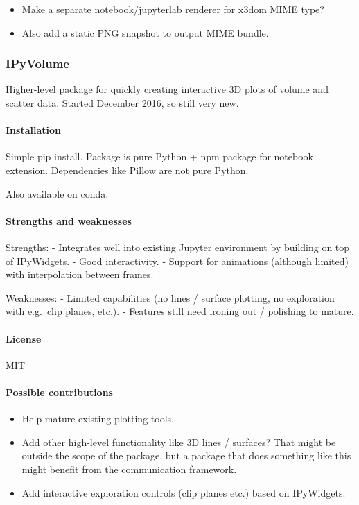 \begin{itemize}
\tightlist
\item
  Make a separate notebook/jupyterlab renderer for x3dom MIME type?
\item
  Also add a static PNG snapshot to output MIME bundle.
\end{itemize}

\subsubsection{IPyVolume}

Higher-level package for quickly creating interactive 3D plots of volume
and scatter data. Started December 2016, so still very new.

\paragraph{Installation}

Simple pip install. Package is pure Python + npm package for notebook
extension. Dependencies like Pillow are not pure Python.

Also available on conda.

\paragraph{Strengths and weaknesses}

Strengths: - Integrates well into existing Jupyter environment by
building on top of IPyWidgets. - Good interactivity. - Support for
animations (although limited) with interpolation between frames.

Weaknesses: - Limited capabilities (no lines / surface plotting, no
exploration with e.g.~clip planes, etc.). - Features still need ironing
out / polishing to mature.

\paragraph{License}

MIT

\paragraph{Possible contributions}

\begin{itemize}
\tightlist
\item
  Help mature existing plotting tools.
\item
  Add other high-level functionality like 3D lines / surfaces? That
  might be outside the scope of the package, but a package that does
  something like this might benefit from the communication framework.
\item
  Add interactive exploration controls (clip planes etc.) based on
  IPyWidgets.
\end{itemize}

